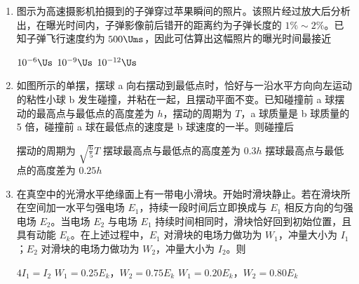 \documentclass[\gkver]{gaokaozhenti}
\begin{document}
\begin{enumerate}

\item
图示为高速摄影机拍摄到的子弹穿过苹果瞬间的照片。该照片经过放大后分析出，在曝光时间内，子弹影像前后错开的距离约为子弹长度的 $1\%\sim2\%$。已知子弹飞行速度约为 $500\Ums$，因此可估算出这幅照片的曝光时间最接近


{$10^{-6}\Us$}
{$10^{-9}\Us$}
{$10^{-12}\Us$}


\item
如图所示的单摆，摆球 a 向右摆动到最低点时，恰好与一沿水平方向向左运动的粘性小球 b 发生碰撞，并粘在一起，且摆动平面不变。已知碰撞前 a 球摆动的最高点与最低点的高度差为 $h$，摆动的周期为 $T$，a 球质量是 b 球质量的 5 倍，碰撞前 a 球在最低点的速度是 b 球速度的一半。则碰撞后


{摆动的周期为 $\sqrt{\frac{6}{5}}T$}
{摆球最高点与最低点的高度差为 $0.3h$}
{摆球最高点与最低点的高度差为 $0.25h$}


\item
在真空中的光滑水平绝缘面上有一带电小滑块。开始时滑块静止。若在滑块所在空间加一水平匀强电场 $E_{1}$，持续一段时间后立即换成与 $E_{1}$ 相反方向的匀强电场 $E_{2}$。当电场 $E_{2}$ 与电场 $E_{1}$ 持续时间相同时，滑块恰好回到初始位置，且具有动能 $E_{k}$。在上述过程中，$E_{1}$ 对滑块的电场力做功为 $W_{1}$，冲量大小为 $I_{1}$；$E_{2}$ 对滑块的电场力做功为 $W_{2}$，冲量大小为 $I_{2}$。则

{$4I_{1}=I_{2}$}
{$W_{1}=0.25E_{k}$，$W_{2}=0.75E_{k}$}
{$W_{1}=0.20E_{k}$，$W_{2}=0.80E_{k}$}


\end{enumerate}
\end{document}
